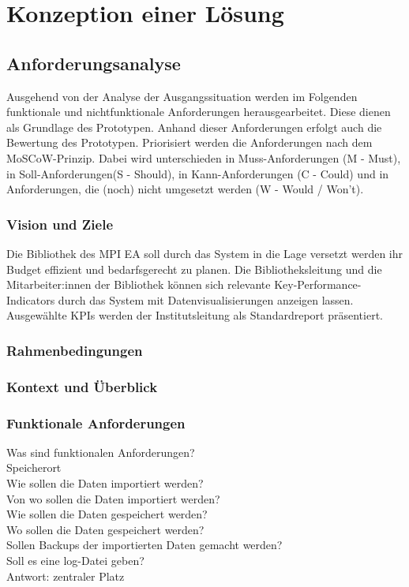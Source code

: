 \chapter{Konzeption einer Lösung}
\label{chap:four}

\section{Anforderungsanalyse}
Ausgehend von der Analyse der Ausgangssituation werden im Folgenden funktionale und nichtfunktionale
Anforderungen herausgearbeitet. Diese dienen als Grundlage des Prototypen. Anhand dieser Anforderungen erfolgt 
auch die Bewertung des Prototypen. Priorisiert werden die Anforderungen nach dem MoSCoW-Prinzip. 
Dabei wird unterschieden in Muss-Anforderungen (M - Must), in Soll-Anforderungen(S - Should), in Kann-Anforderungen (C - Could) und in Anforderungen,
die (noch) nicht umgesetzt werden (W - Would / Won't).

\subsection{Vision und Ziele}
Die Bibliothek des \acrshort{MPI EA} soll durch das System in die Lage versetzt werden ihr Budget effizient und bedarfsgerecht zu planen.
Die Bibliotheksleitung und die Mitarbeiter:innen der Bibliothek können sich relevante Key-Performance-Indicators durch das System mit
Datenvisualisierungen anzeigen lassen. Ausgewählte KPIs werden der Institutsleitung als Standardreport präsentiert.

\subsection{Rahmenbedingungen}

\subsection{Kontext und Überblick}


\subsection{Funktionale Anforderungen}
Was sind funktionalen Anforderungen?\\
Speicherort\\
Wie sollen die Daten importiert werden?\\
Von wo sollen die Daten importiert werden?\\
Wie sollen die Daten gespeichert werden?\\
Wo sollen die Daten gespeichert werden?\\
Sollen Backups der importierten Daten gemacht werden?\\
Soll es eine log-Datei geben?\\
Antwort: zentraler Platz\\

